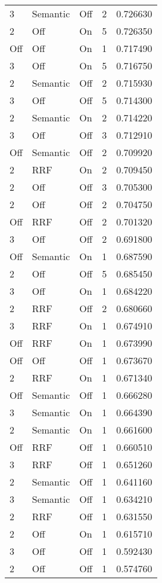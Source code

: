 \begin{tabular}{llllr}
3 & Semantic & Off & 2 & 0.726630 \\
2 & Off & On & 5 & 0.726350 \\
Off & Off & On & 1 & 0.717490 \\
3 & Off & On & 5 & 0.716750 \\
2 & Semantic & Off & 2 & 0.715930 \\
3 & Off & Off & 5 & 0.714300 \\
2 & Semantic & On & 2 & 0.714220 \\
3 & Off & Off & 3 & 0.712910 \\
Off & Semantic & Off & 2 & 0.709920 \\
2 & RRF & On & 2 & 0.709450 \\
2 & Off & Off & 3 & 0.705300 \\
2 & Off & Off & 2 & 0.704750 \\
Off & RRF & Off & 2 & 0.701320 \\
3 & Off & Off & 2 & 0.691800 \\
Off & Semantic & On & 1 & 0.687590 \\
2 & Off & Off & 5 & 0.685450 \\
3 & Off & On & 1 & 0.684220 \\
2 & RRF & Off & 2 & 0.680660 \\
3 & RRF & On & 1 & 0.674910 \\
Off & RRF & On & 1 & 0.673990 \\
Off & Off & Off & 1 & 0.673670 \\
2 & RRF & On & 1 & 0.671340 \\
Off & Semantic & Off & 1 & 0.666280 \\
3 & Semantic & On & 1 & 0.664390 \\
2 & Semantic & On & 1 & 0.661600 \\
Off & RRF & Off & 1 & 0.660510 \\
3 & RRF & Off & 1 & 0.651260 \\
2 & Semantic & Off & 1 & 0.641160 \\
3 & Semantic & Off & 1 & 0.634210 \\
2 & RRF & Off & 1 & 0.631550 \\
2 & Off & On & 1 & 0.615710 \\
3 & Off & Off & 1 & 0.592430 \\
2 & Off & Off & 1 & 0.574760 \\
\bottomrule
\end{tabular}
